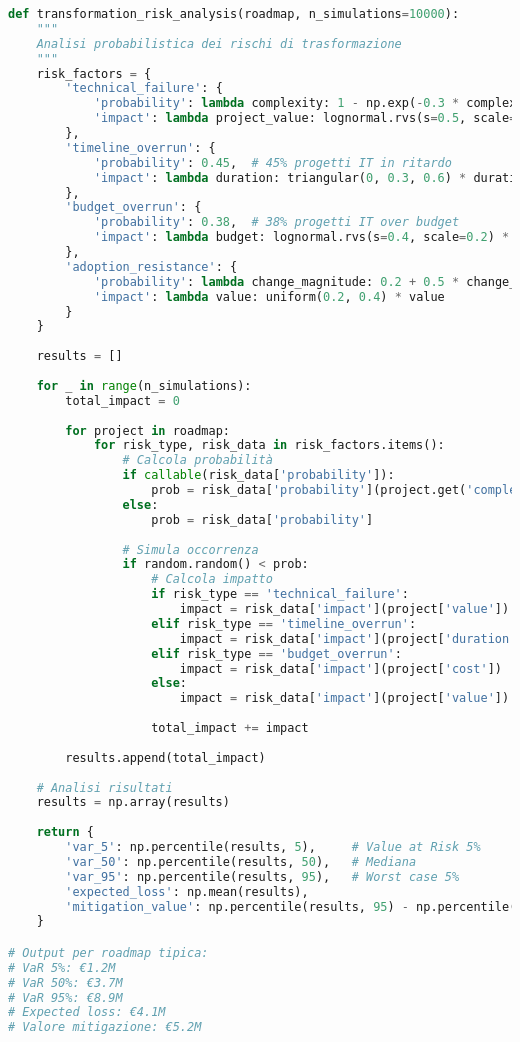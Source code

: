 \begin{lstlisting}[language=Python, caption=Analisi rischi trasformazione]
def transformation_risk_analysis(roadmap, n_simulations=10000):
    """
    Analisi probabilistica dei rischi di trasformazione
    """
    risk_factors = {
        'technical_failure': {
            'probability': lambda complexity: 1 - np.exp(-0.3 * complexity),
            'impact': lambda project_value: lognormal.rvs(s=0.5, scale=0.3) * project_value
        },
        'timeline_overrun': {
            'probability': 0.45,  # 45% progetti IT in ritardo
            'impact': lambda duration: triangular(0, 0.3, 0.6) * duration
        },
        'budget_overrun': {
            'probability': 0.38,  # 38% progetti IT over budget
            'impact': lambda budget: lognormal.rvs(s=0.4, scale=0.2) * budget
        },
        'adoption_resistance': {
            'probability': lambda change_magnitude: 0.2 + 0.5 * change_magnitude,
            'impact': lambda value: uniform(0.2, 0.4) * value
        }
    }
    
    results = []
    
    for _ in range(n_simulations):
        total_impact = 0
        
        for project in roadmap:
            for risk_type, risk_data in risk_factors.items():
                # Calcola probabilità
                if callable(risk_data['probability']):
                    prob = risk_data['probability'](project.get('complexity', 0.5))
                else:
                    prob = risk_data['probability']
                    
                # Simula occorrenza
                if random.random() < prob:
                    # Calcola impatto
                    if risk_type == 'technical_failure':
                        impact = risk_data['impact'](project['value'])
                    elif risk_type == 'timeline_overrun':
                        impact = risk_data['impact'](project['duration']) * 50000  # €/mese
                    elif risk_type == 'budget_overrun':
                        impact = risk_data['impact'](project['cost'])
                    else:
                        impact = risk_data['impact'](project['value'])
                        
                    total_impact += impact
                    
        results.append(total_impact)
        
    # Analisi risultati
    results = np.array(results)
    
    return {
        'var_5': np.percentile(results, 5),     # Value at Risk 5%
        'var_50': np.percentile(results, 50),   # Mediana
        'var_95': np.percentile(results, 95),   # Worst case 5%
        'expected_loss': np.mean(results),
        'mitigation_value': np.percentile(results, 95) - np.percentile(results, 50)
    }

# Output per roadmap tipica:
# VaR 5%: €1.2M
# VaR 50%: €3.7M
# VaR 95%: €8.9M
# Expected loss: €4.1M
# Valore mitigazione: €5.2M
\end{lstlisting}

